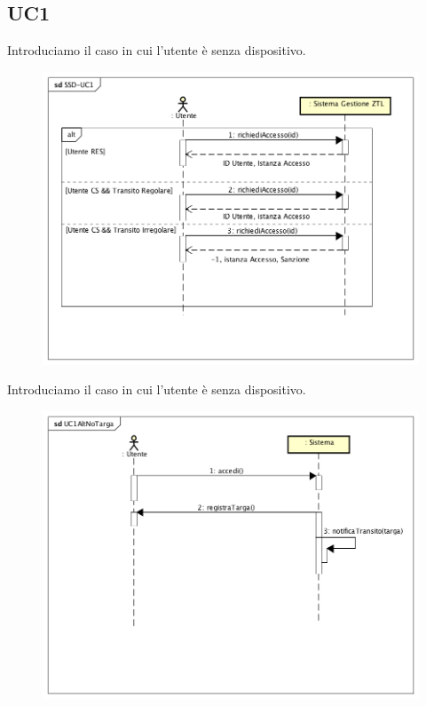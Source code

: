 \documentclass[12pt, letterpaper]{article}
\begin{document}
\subsection{UC1}
Introduciamo il caso in cui l'utente è senza 
dispositivo.
\begin{figure}[H]
    \centering
    \includegraphics[scale=0.50]{UC1-SSD}
\end{figure}

\noindent
Introduciamo il caso in cui l'utente è senza 
dispositivo.
\begin{figure}[H]
    \centering
    \includegraphics[scale=0.50]{UC1NoTarga}
\end{figure}
\end{document}
